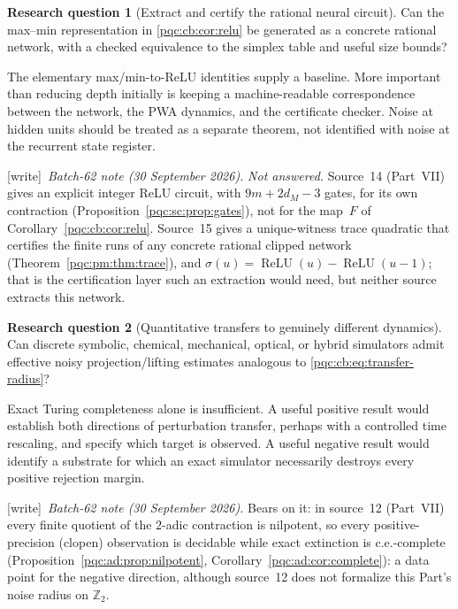 \documentclass[11pt,letterpaper]{article}
\numberwithin{equation}{section}
\theoremstyle{definition}
\newtheorem{question}{Research question}
\theoremstyle{remark}
\newcommand{\Z}{\mathbb Z}
\newcommand{\wtag}{\textup{[write]}}
\newcommand{\ReLU}{\operatorname{ReLU}}
\begin{document}
\begin{question}[Extract and certify the rational neural circuit]\label{pqc:cb:q:neural}
Can the max--min representation in \cref{pqc:cb:cor:relu} be generated as a concrete
rational network, with a checked equivalence to the simplex table and useful
size bounds?
\end{question}
The elementary max/min-to-ReLU identities supply a baseline.  More important
than reducing depth initially is keeping a machine-readable correspondence
between the network, the PWA dynamics, and the certificate checker.  Noise at
hidden units should be treated as a separate theorem, not identified with
noise at the recurrent state register.
\par\noindent\wtag\ \emph{Batch-62 note (30 September 2026).} \emph{Not answered.} Source~14 (Part~VII) gives an explicit integer ReLU
circuit, with $9m+2d_M-3$ gates, for its own contraction
(Proposition~\ref{pqc:sc:prop:gates}), not for the map~$F$ of
Corollary~\ref{pqc:cb:cor:relu}. Source~15 gives a unique-witness trace
quadratic that certifies the finite runs of any concrete rational clipped
network (Theorem~\ref{pqc:pm:thm:trace}), and $\sigma(u)=\ReLU(u)-\ReLU(u-1)$;
that is the certification layer such an extraction would need, but neither
source extracts this network.

\begin{question}[Quantitative transfers to genuinely different dynamics]\label{pqc:cb:q:transfer}
Can discrete symbolic, chemical, mechanical, optical, or hybrid simulators
admit effective noisy projection/lifting estimates analogous to
\eqref{pqc:cb:eq:transfer-radius}?
\end{question}
Exact Turing completeness alone is insufficient.  A useful positive result
would establish both directions of perturbation transfer, perhaps with a
controlled time rescaling, and specify which target is observed.  A useful
negative result would identify a substrate for which an exact simulator
necessarily destroys every positive rejection margin.
\par\noindent\wtag\ \emph{Batch-62 note (30 September 2026).} Bears on it: in source~12 (Part~VII) every finite quotient of the
$2$-adic contraction is nilpotent, so every positive-precision (clopen)
observation is decidable while exact extinction is c.e.-complete
(Proposition~\ref{pqc:ad:prop:nilpotent}, Corollary~\ref{pqc:ad:cor:complete}):
a data point for the negative direction, although source~12 does not formalize
this Part's noise radius on $\Z_2$.
\end{document}
